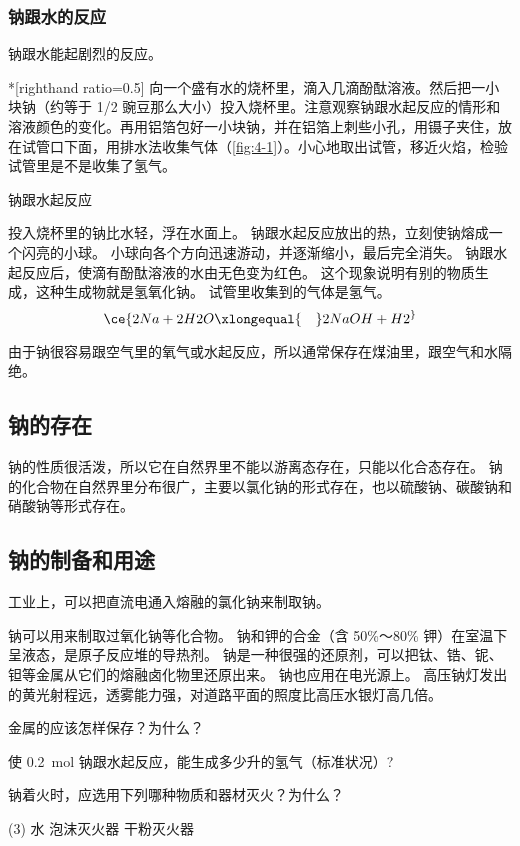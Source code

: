 \subsubsection{钠跟水的反应}
钠跟水能起剧烈的反应。
\begin{Experiment}*[righthand ratio=0.5]
向一个盛有水的烧杯里，滴入几滴酚酞溶液。然后把一小块钠（约等于 1/2 豌豆那么大小）投入烧杯里。注意观察钠跟水起反应的情形和溶液颜色的变化。再用铝箔包好一小块钠，并在铝箔上刺些小孔，用镊子夹住，放在试管口下面，用排水法收集气体（\cref{fig:4-1}）。小心地取出试管，移近火焰，检验试管里是不是收集了氢气。
  \tcblower
  \begin{figurehere}
    \caption{钠跟水起反应}\label{fig:4-1}
  \end{figurehere}
\end{Experiment}
投入烧杯里的钠比水轻，浮在水面上。
钠跟水起反应放出的热，立刻使钠熔成一个闪亮的小球。
小球向各个方向迅速游动，并逐渐缩小，最后完全消失。
钠跟水起反应后，使滴有酚酞溶液的水由无色变为红色。
这个现象说明有别的物质生成，这种生成物就是氢氧化钠。
试管里收集到的气体是氢气。
\[ \ce{2Na + 2H2O \xlongequal{\quad} 2NaOH +H2 ^}\]

由于钠很容易跟空气里的氧气或水起反应，所以通常保存在煤油里，跟空气和水隔绝。

\subsection{钠的存在}
钠的性质很活泼，所以它在自然界里不能以游离态存在，只能以化合态存在。
钠的化合物在自然界里分布很广，主要以氯化钠的形式存在，也以硫酸钠、碳酸钠和硝酸钠等形式存在。

\subsection{钠的制备和用途}
工业上，可以把直流电通入熔融的氯化钠来制取钠。

钠可以用来制取过氧化钠等化合物。
钠和钾的合金（含 50\%～80\% 钾）在室温下呈液态，是原子反应堆的导热剂。
钠是一种很强的还原剂，可以把钛、锆、铌、钽等金属从它们的熔融卤化物里还原出来。
钠也应用在电光源上。
高压钠灯发出的黄光射程远，透雾能力强，对道路平面的照度比高压水银灯高几倍。

\begin{Practice}[习题]
  \begin{question}
    \item 金属的应该怎样保存？为什么？
    \item 使 \qty{0.2}{mol} 钠跟水起反应，能生成多少升的氢气（标准状况）?
    \item 钠着火时，应选用下列哪种物质和器材灭火？为什么？
    \begin{tasks}(3)
      \task 水
      \task 泡沫灭火器
      \task 干粉灭火器
    \end{tasks}
  \end{question}
\end{Practice}

